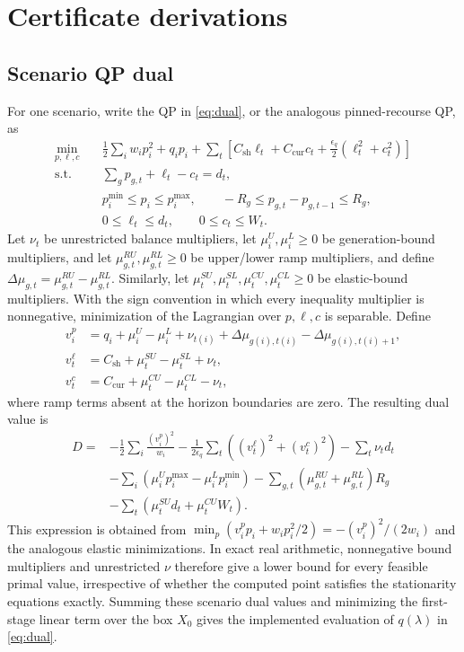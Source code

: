 \documentclass[preprint,12pt,3p]{elsarticle}
\theoremstyle{definition}
\begin{document}
\appendix
\section{Certificate derivations}\label{app:certificates}
\subsection{Scenario QP dual}\label{app:dual}
For one scenario, write the QP in \eqref{eq:dual}, or the analogous pinned-recourse QP, as
\begin{align*}
\min_{p,\ell,c}\quad &\frac12\sum_iw_ip_i^2+q_ip_i+\sum_t\left[C_{\mathrm{sh}}\ell_t+C_{\mathrm{cur}}c_t+\frac{\epsilon_q}{2}(\ell_t^2+c_t^2)\right]\\
\mathrm{s.t.}\quad &\sum_gp_{g,t}+\ell_t-c_t=d_t,\\
&p_i^{\min}\leq p_i\leq p_i^{\max},\qquad -R_g\leq p_{g,t}-p_{g,t-1}\leq R_g,\\
&0\leq\ell_t\leq d_t,\qquad0\leq c_t\leq W_t.
\end{align*}
Let $\nu_t$ be unrestricted balance multipliers, let $\mu_i^U,\mu_i^L\geq0$ be generation-bound multipliers, and let $\mu_{g,t}^{RU},\mu_{g,t}^{RL}\geq0$ be upper/lower ramp multipliers, and define $\Delta\mu_{g,t}=\mu_{g,t}^{RU}-\mu_{g,t}^{RL}$. Similarly, let $\mu_t^{SU},\mu_t^{SL},\mu_t^{CU},\mu_t^{CL}\geq0$ be elastic-bound multipliers. With the sign convention in which every inequality multiplier is nonnegative, minimization of the Lagrangian over $p,\ell,c$ is separable. Define
\begin{align*}
v_i^p&=q_i+\mu_i^U-\mu_i^L+\nu_{t(i)}+\Delta\mu_{g(i),t(i)}-\Delta\mu_{g(i),t(i)+1},\\
v_t^\ell&=C_{\mathrm{sh}}+\mu_t^{SU}-\mu_t^{SL}+\nu_t,\\
v_t^c&=C_{\mathrm{cur}}+\mu_t^{CU}-\mu_t^{CL}-\nu_t,
\end{align*}
where ramp terms absent at the horizon boundaries are zero. The resulting dual value is
\begin{align}
D={}&-\frac12\sum_i\frac{(v_i^p)^2}{w_i}
-\frac1{2\epsilon_q}\sum_t\left((v_t^\ell)^2+(v_t^c)^2\right)
-\sum_t\nu_td_t\nonumber\\
&-\sum_i(\mu_i^Up_i^{\max}-\mu_i^Lp_i^{\min})
-\sum_{g,t}(\mu_{g,t}^{RU}+\mu_{g,t}^{RL})R_g\nonumber\\
&-\sum_t(\mu_t^{SU}d_t+\mu_t^{CU}W_t).
\label{eq:qpdual}
\end{align}
This expression is obtained from $\min_p(v_i^pp_i+w_ip_i^2/2)=-(v_i^p)^2/(2w_i)$ and the analogous elastic minimizations. In exact real arithmetic, nonnegative bound multipliers and unrestricted $\nu$ therefore give a lower bound for every feasible primal value, irrespective of whether the computed point satisfies the stationarity equations exactly. Summing these scenario dual values and minimizing the first-stage linear term over the box $X_0$ gives the implemented evaluation of $q(\lambda)$ in \eqref{eq:dual}.
\end{document}
